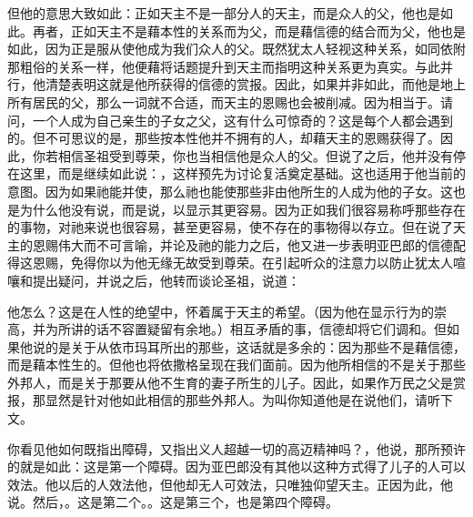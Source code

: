 但他的意思大致如此：正如天主不是一部分人的天主，而是众人的父，他也是如此。再者，正如天主不是藉本性的关系而为父，而是藉信德的结合而为父，他也是如此，因为正是服从使他成为我们众人的父。既然犹太人轻视这种关系，如同依附那粗俗的关系一样，他便藉将话题提升到天主而指明这种关系更为真实。与此并行，他清楚表明这就是他所获得的信德的赏报。因此，如果并非如此，而他是地上所有居民的父，那么一词就不合适，而天主的恩赐也会被削减。因为相当于。请问，一个人成为自己亲生的子女之父，这有什么可惊奇的？这是每个人都会遇到的。但不可思议的是，那些按本性他并不拥有的人，却藉天主的恩赐获得了。因此，你若相信圣祖受到尊荣，你也当相信他是众人的父。但说了之后，他并没有停在这里，而是继续如此说：，这样预先为讨论复活奠定基础。这也适用于他当前的意图。因为如果祂能并使，那么祂也能使那些非由他所生的人成为他的子女。这也是为什么他没有说，而是说，以显示其更容易。因为正如我们很容易称呼那些存在的事物，对祂来说也很容易，甚至更容易，使不存在的事物得以存立。但在说了天主的恩赐伟大而不可言喻，并论及祂的能力之后，他又进一步表明亚巴郎的信德配得这恩赐，免得你以为他无缘无故受到尊荣。在引起听众的注意力以防止犹太人喧嚷和提出疑问，并说之后，他转而谈论圣祖，说道：\par

\par

他怎么？这是在人性的绝望中，怀着属于天主的希望。（因为他在显示行为的崇高，并为所讲的话不容置疑留有余地。）相互矛盾的事，信德却将它们调和。但如果他说的是关于从依市玛耳所出的那些，这话就是多余的：因为那些不是藉信德，而是藉本性生的。但他也将依撒格呈现在我们面前。因为他所相信的不是关于那些外邦人，而是关于那要从他不生育的妻子所生的儿子。因此，如果作万民之父是赏报，那显然是针对他如此相信的那些外邦人。为叫你知道他是在说他们，请听下文。\par

\par

你看见他如何既指出障碍，又指出义人超越一切的高迈精神吗？，他说，那所预许的就是如此：这是第一个障碍。因为亚巴郎没有其他以这种方式得了儿子的人可以效法。他以后的人效法他，但他却无人可效法，只唯独仰望天主。正因为此，他说。然后，。这是第二个。。这是第三个，也是第四个障碍。\par

